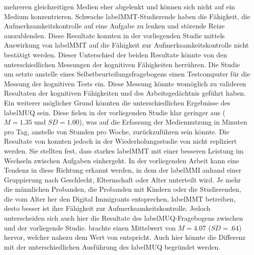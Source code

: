 mehreren gleichzeitigen Medien eher abgelenkt und können sich nicht auf ein Medium konzentrieren. Schwache \gls{labelMMT}-Studierende haben die Fähigkeit, die Aufmerksamkeitskontrolle auf eine Aufgabe zu lenken und störende Reize auszublenden. Diese Resultate konnten in der vorliegenden Studie mittels Auswirkung von \gls{labelMMT} auf die Fähigkeit zur Aufmerksamkeitskontrolle nicht bestätigt werden. Dieser Unterschied der beiden Resultate könnte von den unterschiedlichen Messungen der kognitiven Fähigkeiten herrühren. Die Studie um  setzte anstelle eines Selbstbeurteilungsfragebogens einen Testcomputer für die Messung der kognitiven Tests ein. Diese Messung könnte womöglich zu valideren Resultaten der kognitiven Fähigkeiten und des Arbeitsgedächtnis geführt haben. Ein weiterer möglicher Grund könnten die unterschiedlichen Ergebnisse des \gls{labelMUQ} sein. Diese fielen in der vorliegenden Studie klar geringer aus ($M=1.35$ und $SD=1.00$), was auf die Erfassung der Mediennutzung in Minuten pro Tag, anstelle von Stunden pro Woche, zurückzuführen sein könnte. Die Resultate von  konnten jedoch in der Wiederholungsstudie von  nicht repliziert werden. Sie stellten fest, dass starkes \gls{labelMMT} mit einer besseren Leistung im Wechseln zwischen Aufgaben einhergeht. In der vorliegenden Arbeit kann eine Tendenz in diese Richtung erkannt werden, in dem der \gls{labelMMI} anhand einer Gruppierung nach Geschlecht, Elternschaft oder Alter unterteilt wird. Je mehr die männlichen Probanden, die Probanden mit Kindern oder die Studierenden, die vom Alter her den Digital Immigrants entsprechen, \gls{labelMMT} betreiben, desto besser ist ihre Fähigkeit zur Aufmerksamkeitskontrolle. Jedoch unterscheiden sich auch hier die Resultate des \gls{labelMUQ}-Fragebogens zwischen  und der vorliegende Studie. \citeauthor{Alzahabi2013} brachte einen Mittelwert von $M=4.07$ ($SD=.64$) hervor, welcher nahezu dem Wert von  entspricht. Auch hier könnte die Differenz mit der unterschiedlichen Ausführung des \gls{labelMUQ} begründet werden. 

